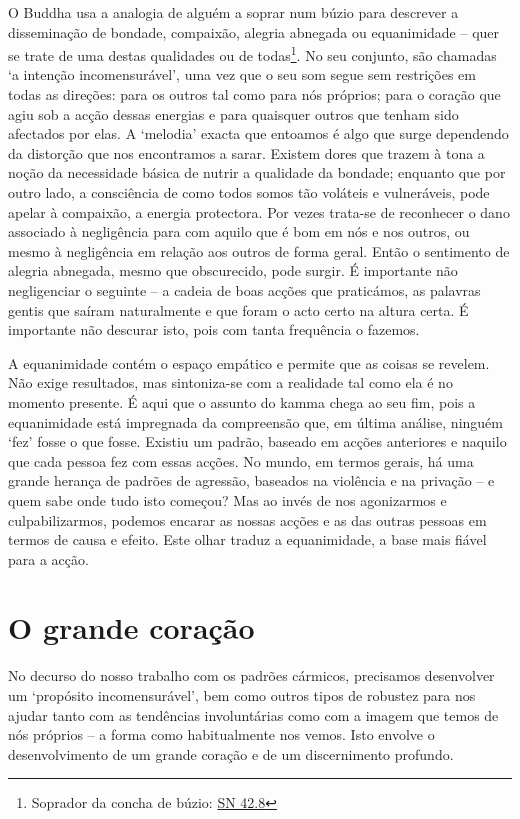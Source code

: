 O Buddha usa a analogia de alguém a soprar num búzio para descrever a disseminação de bondade, compaixão, alegria abnegada ou equanimidade -- quer se trate de uma destas qualidades ou de todas\footnote{Soprador da concha de búzio: \href{https://suttacentral.net/sn42.8/en/sujato}{SN 42.8}}. No seu conjunto, são chamadas `a intenção incomensurável', uma vez que o seu som segue sem restrições em todas as direções: para os outros tal como para nós próprios; para o coração que agiu sob a acção dessas energias e para quaisquer outros que tenham sido afectados por elas. A `melodia' exacta que entoamos é algo que surge dependendo da distorção que nos encontramos a sarar. Existem dores que trazem à tona a noção da necessidade básica de nutrir a qualidade da bondade; enquanto que por outro lado, a consciência de como todos somos tão voláteis e vulneráveis, pode apelar à compaixão, a energia protectora. Por vezes trata-se de reconhecer o dano associado à negligência para com aquilo que é bom em nós e nos outros, ou mesmo à negligência em relação aos outros de forma geral. Então o sentimento de alegria abnegada, mesmo que obscurecido, pode surgir. É importante não negligenciar o seguinte -- a cadeia de boas acções que praticámos, as palavras gentis que saíram naturalmente e que foram o acto certo na altura certa. É importante não descurar isto, pois com tanta frequência o fazemos.

A equanimidade contém o espaço empático e permite que as coisas se revelem. Não exige resultados, mas sintoniza-se com a realidade tal como ela é no momento presente. É aqui que o assunto do kamma chega ao seu fim, pois a equanimidade está impregnada da compreensão que, em última análise, ninguém `fez' fosse o que fosse. Existiu um padrão, baseado em acções anteriores e naquilo que cada pessoa fez com essas acções. No mundo, em termos gerais, há uma grande herança de padrões de agressão, baseados na violência e na privação -- e quem sabe onde tudo isto começou? Mas ao invés de nos agonizarmos e culpabilizarmos, podemos encarar as nossas acções e as das outras pessoas em termos de causa e efeito. Este olhar traduz a equanimidade, a base mais fiável para a acção.

\section{O grande coração}

No decurso do nosso trabalho com os padrões cármicos, precisamos desenvolver um `propósito incomensurável', bem como outros tipos de robustez para nos ajudar tanto com as tendências involuntárias como com a imagem que temos de nós próprios -- a forma como habitualmente nos vemos. Isto envolve o desenvolvimento de um grande coração e de um discernimento profundo.

